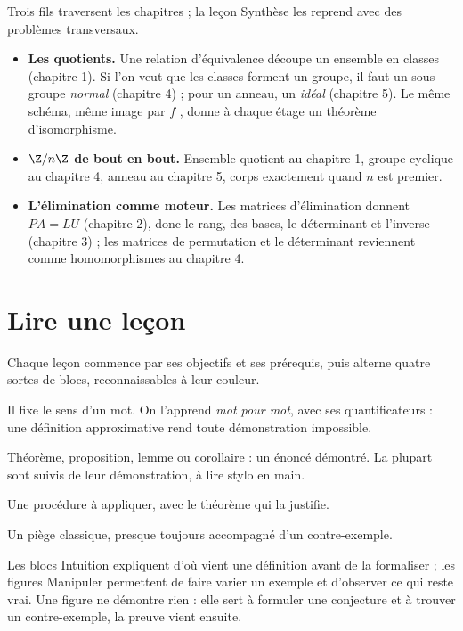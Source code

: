 Trois fils traversent les chapitres ; la leçon \og Synthèse \fg{} les reprend avec des problèmes transversaux.
\begin{itemize}
\item \textbf{Les quotients.} Une relation d'équivalence découpe un ensemble en classes (chapitre 1). Si l'on veut que les classes forment un groupe, il faut un sous-groupe \emph{normal} (chapitre 4) ; pour un anneau, un \emph{idéal} (chapitre 5). Le même schéma, \og même image par $f$ \fg, donne à chaque étage un théorème d'isomorphisme.
\item \textbf{$\Z/n\Z$ de bout en bout.} Ensemble quotient au chapitre 1, groupe cyclique au chapitre 4, anneau au chapitre 5, corps exactement quand $n$ est premier.
\item \textbf{L'élimination comme moteur.} Les matrices d'élimination donnent $PA=LU$ (chapitre 2), donc le rang, des bases, le déterminant et l'inverse (chapitre 3) ; les matrices de permutation et le déterminant reviennent comme homomorphismes au chapitre 4.
\end{itemize}

\section{Lire une leçon}
Chaque leçon commence par ses objectifs et ses prérequis, puis alterne quatre sortes de blocs, reconnaissables à leur couleur.
\begin{definition}
Il fixe le sens d'un mot. On l'apprend \emph{mot pour mot}, avec ses quantificateurs : une définition approximative rend toute démonstration impossible.
\end{definition}
\begin{theoreme}
Théorème, proposition, lemme ou corollaire : un énoncé démontré. La plupart sont suivis de leur démonstration, à lire stylo en main.
\end{theoreme}
\begin{methode}
Une procédure à appliquer, avec le théorème qui la justifie.
\end{methode}
\begin{attention}
Un piège classique, presque toujours accompagné d'un contre-exemple.
\end{attention}
Les blocs \og Intuition \fg{} expliquent d'où vient une définition avant de la formaliser ; les figures \og Manipuler \fg{} permettent de faire varier un exemple et d'observer ce qui reste vrai. Une figure ne démontre rien : elle sert à formuler une conjecture et à trouver un contre-exemple, la preuve vient ensuite.

